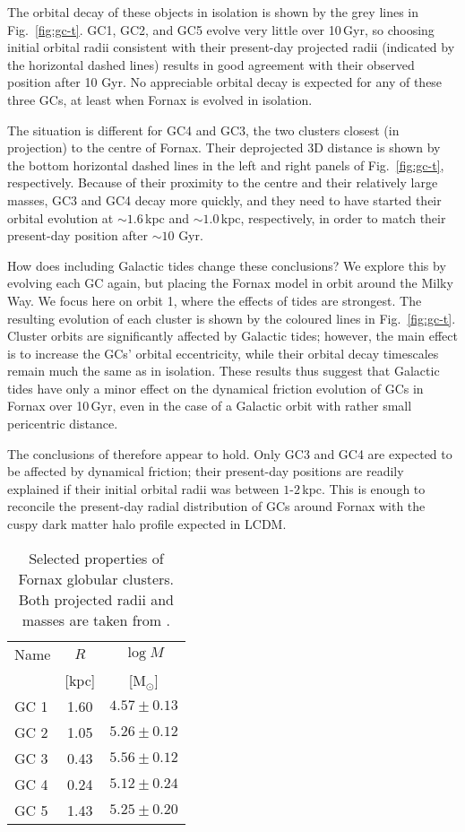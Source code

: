 \documentclass[fleqn,usenatbib]{mnras}
\begin{document}
The orbital decay of these objects in isolation is shown by the grey lines in Fig.~\ref{fig:gc-t}. GC1, GC2, and GC5 evolve very little over 10\,Gyr, so choosing initial orbital radii consistent with their present-day projected radii (indicated by the horizontal dashed lines) results in good agreement with their observed position after 10 Gyr. No appreciable orbital decay is expected for any of these three GCs, at least when Fornax is evolved in isolation.

The situation is different for GC4 and GC3, the two clusters closest (in projection) to the centre of Fornax. Their deprojected 3D distance is shown by the bottom horizontal dashed lines in the left and right panels of Fig.~\ref{fig:gc-t}, respectively. Because of their proximity to the centre and their relatively large masses, GC3 and GC4 decay more quickly, and they need to have started their orbital evolution at $\sim 1.6$\,kpc and $\sim 1.0$\,kpc, respectively, in order to match their present-day position after $\sim 10$ Gyr.

How does including Galactic tides change these conclusions? We explore this by evolving each GC again, but placing the Fornax model in orbit around the Milky Way. We focus here on orbit 1, where the effects of tides are strongest. The resulting evolution of each cluster is shown by the coloured lines in Fig.~\ref{fig:gc-t}. Cluster orbits are significantly affected by Galactic tides; however, the main effect is to increase the GCs' orbital eccentricity, while their orbital decay timescales remain much the same as in isolation.  These results thus suggest that Galactic tides have only a minor effect on the dynamical friction evolution of GCs in Fornax over 10\,Gyr, even in the case of a Galactic orbit with rather small pericentric distance.

The conclusions of \citet{Meadows2020} therefore appear to hold. Only GC3 and GC4 are expected to be affected by dynamical friction; their present-day positions are readily explained if their initial orbital radii was between $1$-$2$\,kpc. This is enough to reconcile the present-day radial distribution of GCs around Fornax with the cuspy dark matter halo profile expected in LCDM.

\begin{table}
	\centering
	\caption{Selected properties of Fornax globular clusters. Both projected radii and masses are taken from \citep{Mackey2003}.}
	\label{tab:gcs}
	\begin{tabular}{lcc}
		\hline
		Name & $R$ & $\log M$\\
		 & [kpc] & [M$_\odot$]\\
		\hline
		GC 1 & 1.60 & $4.57\pm 0.13$\\
		GC 2 & 1.05 & $5.26\pm 0.12$\\
		GC 3 & 0.43 & $5.56\pm 0.12$\\
		GC 4 & 0.24 & $5.12\pm 0.24$\\
		GC 5 & 1.43 & $5.25\pm 0.20$\\
		\hline
	\end{tabular}
\end{table}
\end{document}
